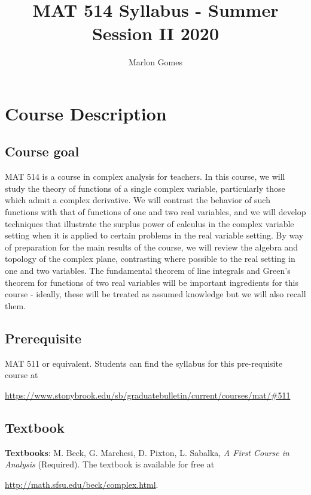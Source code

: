\documentclass[11pt]{amsart}
\title[MAT 514 - Summer 2020 Syllabus]{MAT 514 Syllabus - Summer Session II 2020}
\author[M. Gomes]{Marlon Gomes}
\numberwithin{equation}{section}
\begin{document}
\maketitle


\section{Course Description}
\subsection{Course goal}
MAT 514 is a course in complex analysis for teachers. In this course, we will study the theory of functions of a single complex variable, particularly those which admit a complex derivative. We will contrast the behavior of such functions with that of functions of one and two real variables, and we will develop techniques that illustrate the surplus power of calculus in the complex variable setting when it is applied to certain problems in the real variable setting. By way of preparation for the main results of the course, we will review the algebra and topology of the complex plane, contrasting where possible to the real setting in one and two variables. The fundamental theorem of line integrals and Green's theorem for functions of two real variables will be important ingredients for this course - ideally, these will be treated as assumed knowledge but we will also recall them.\\

\subsection{Prerequisite}
MAT 511 or equivalent. Students can find the syllabus for this pre-requisite course at 
\begin{center}
\url{https://www.stonybrook.edu/sb/graduatebulletin/current/courses/mat/#511}
\end{center}

\subsection{Textbook}
\textbf{Textbooks}: M. Beck, G. Marchesi, D. Pixton, L. Sabalka, \textit{A First Course in Analysis} (Required). The textbook is available for free at 
\begin{center}
\url{http://math.sfsu.edu/beck/complex.html}.
\end{center}
\end{document}
